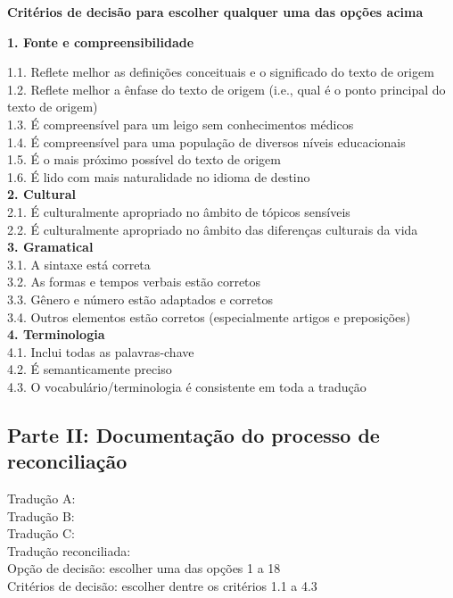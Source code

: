 \documentclass[
  ,doc,11pt, twoside,floatsintext]{apa6}
\begin{document}
\begin{appendix}
\begin{flushleft}
\textbf{Critérios de decisão para escolher qualquer uma das opções acima}

\smallskip

\textbf{1.	Fonte e compreensibilidade}

1.1.	 Reflete melhor as definições conceituais e o significado do texto de origem\\
1.2.	 Reflete melhor a ênfase do texto de origem (i.e., qual é o ponto principal do texto de origem)\\
1.3.	 É compreensível para um leigo sem conhecimentos médicos\\
1.4.	 É compreensível para uma população de diversos níveis educacionais\\
1.5.	 É o mais próximo possível do texto de origem\\
1.6.	 É lido com mais naturalidade no idioma de destino\\
\textbf{2.	Cultural}\\
2.1.	 É culturalmente apropriado no âmbito de tópicos sensíveis\\
2.2.	 É culturalmente apropriado no âmbito das diferenças culturais da vida\\
\textbf{3.	Gramatical}\\
3.1.	 A sintaxe está correta\\
3.2.	 As formas e tempos verbais estão corretos\\
3.3.	 Gênero e número estão adaptados e corretos\\
3.4.	 Outros elementos estão corretos (especialmente artigos e preposições)\\
\textbf{4.	Terminologia}\\
4.1.	 Inclui todas as palavras-chave\\
4.2.	 É semanticamente preciso\\
4.3.	 O vocabulário/terminologia é consistente em toda a tradução\\

\subsection{Parte II: Documentação do processo de reconciliação}

Tradução A:\\
Tradução B:\\
Tradução C:\\
Tradução reconciliada:\\
Opção de decisão: escolher uma das opções 1 a 18\\
Critérios de decisão: escolher dentre os critérios 1.1 a 4.3
\end{flushleft}
\end{appendix}
\end{document}
